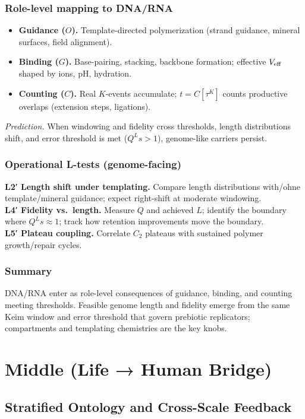 \documentclass[12pt,a4paper,oneside]{scrreprt}
\begin{document}
\section{Role-level mapping to DNA/RNA}\label{sec:life-dna-mapping}
\begin{itemize}
\item \textbf{Guidance ($O$).} Template-directed polymerization (strand guidance, mineral surfaces, field alignment).
\item \textbf{Binding ($G$).} Base-pairing, stacking, backbone formation; effective $V_{\rm eff}$ shaped by ions, pH, hydration.
\item \textbf{Counting ($C$).} Real $K$-events accumulate; $t=C[\tau^K]$ counts productive overlaps (extension steps, ligations).
\end{itemize}
\emph{Prediction.} When windowing and fidelity cross thresholds, length distributions shift, and error threshold is met ($Q^L s>1$), genome-like carriers persist.

\section{Operational L-tests (genome-facing)}\label{sec:life-dna-tests}
\textbf{L2′ Length shift under templating.} Compare length distributions with/ohne template/mineral guidance; expect right-shift at moderate windowing.\\
\textbf{L4′ Fidelity vs.\ length.} Measure $Q$ and achieved $L$; identify the boundary where $Q^L s\approx 1$; track how retention improvements move the boundary.\\
\textbf{L5′ Plateau coupling.} Correlate $C_2$ plateaus with sustained polymer growth/repair cycles.

\section*{Summary}
DNA/RNA enter as role-level consequences of guidance, binding, and counting meeting thresholds. 
Feasible genome length and fidelity emerge from the same Keim window and error threshold that govern prebiotic replicators; compartments and templating chemistries are the key knobs.

\part{Middle (Life → Human Bridge)}

\chapter{Stratified Ontology and Cross-Scale Feedback}\label{ch:bridge}
\end{document}
